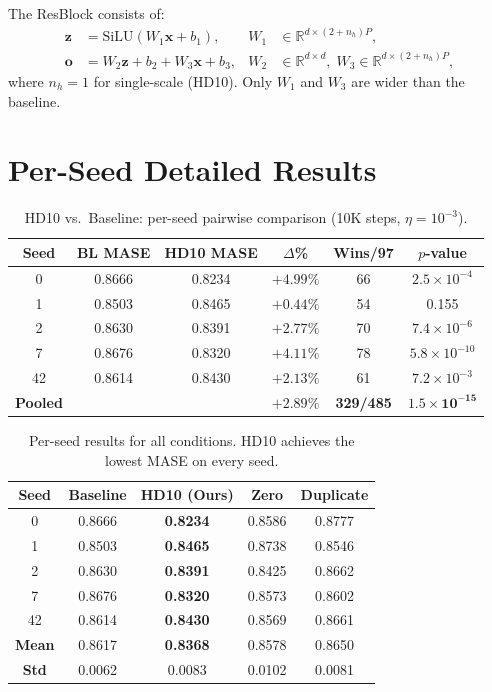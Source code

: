 \documentclass{article}
\begin{document}
The ResBlock consists of:
\begin{align}
\mathbf{z} &= \text{SiLU}(W_1 \mathbf{x} + b_1), & W_1 &\in \mathbb{R}^{d \times (2+n_h)P}, \\
\mathbf{o} &= W_2 \mathbf{z} + b_2 + W_3 \mathbf{x} + b_3, & W_2 &\in \mathbb{R}^{d \times d}, \; W_3 \in \mathbb{R}^{d \times (2+n_h)P},
\end{align}
where $n_h = 1$ for single-scale (HD10). Only $W_1$ and $W_3$ are wider than the baseline.

\section{Per-Seed Detailed Results}
\label{app:seeds}

\begin{table}[h]
\centering
\caption{HD10 vs.\ Baseline: per-seed pairwise comparison (10K steps, $\eta = 10^{-3}$).}
\small
\begin{tabular}{cccccc}
\toprule
\textbf{Seed} & \textbf{BL MASE} & \textbf{HD10 MASE} & \textbf{$\Delta$\%} & \textbf{Wins/97} & \textbf{$p$-value} \\
\midrule
0 & 0.8666 & 0.8234 & $+4.99\%$ & 66 & $2.5 \times 10^{-4}$ \\
1 & 0.8503 & 0.8465 & $+0.44\%$ & 54 & 0.155 \\
2 & 0.8630 & 0.8391 & $+2.77\%$ & 70 & $7.4 \times 10^{-6}$ \\
7 & 0.8676 & 0.8320 & $+4.11\%$ & 78 & $5.8 \times 10^{-10}$ \\
42 & 0.8614 & 0.8430 & $+2.13\%$ & 61 & $7.2 \times 10^{-3}$ \\
\midrule
\textbf{Pooled} & & & \textbf{$+2.89\%$} & \textbf{329/485} & $\mathbf{1.5 \times 10^{-15}}$ \\
\bottomrule
\end{tabular}
\end{table}

\begin{table}[h]
\centering
\caption{Per-seed results for all conditions. HD10 achieves the lowest MASE on every seed.}
\small
\begin{tabular}{ccccc}
\toprule
\textbf{Seed} & \textbf{Baseline} & \textbf{HD10 (Ours)} & \textbf{Zero} & \textbf{Duplicate} \\
\midrule
0 & 0.8666 & \textbf{0.8234} & 0.8586 & 0.8777 \\
1 & 0.8503 & \textbf{0.8465} & 0.8738 & 0.8546 \\
2 & 0.8630 & \textbf{0.8391} & 0.8425 & 0.8662 \\
7 & 0.8676 & \textbf{0.8320} & 0.8573 & 0.8602 \\
42 & 0.8614 & \textbf{0.8430} & 0.8569 & 0.8661 \\
\midrule
\textbf{Mean} & 0.8617 & \textbf{0.8368} & 0.8578 & 0.8650 \\
\textbf{Std} & 0.0062 & 0.0083 & 0.0102 & 0.0081 \\
\bottomrule
\end{tabular}
\end{table}
\end{document}
